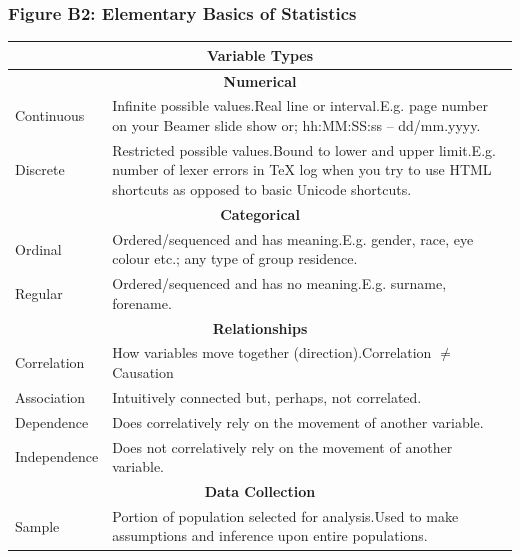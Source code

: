\documentclass[11pt, english]{article}
\begin{document}
		\subsubsection*{Figure B2: Elementary Basics of Statistics}

		\begin{center}
			\scriptsize
		\begin{longtable}{p{3cm}p{9cm}}
			\hline
			\hline
			\multicolumn{2}{c}{\textbf{Variable Types}}\\
			\hline
			\hline
			\multicolumn{2}{c}{\textbf{Numerical}}\\
			\hline
			Continuous & Infinite possible values.\newline Real line or interval.\newline E.g. page number on your Beamer slide show or; hh:MM:SS:ss -- dd/mm.yyyy.\\
			Discrete & Restricted possible values.\newline Bound to lower and upper limit.\newline E.g. number of lexer errors in {\TeX} log when you try to use HTML shortcuts as opposed to basic Unicode shortcuts.\\
			\hline
			\multicolumn{2}{c}{\textbf{Categorical}}\\
			\hline
			Ordinal & Ordered/sequenced and has meaning.\newline E.g. gender, race, eye colour etc.; any type of group residence.\\
			Regular & Ordered/sequenced and has no meaning.\newline E.g. surname, forename.\\
			\hline
			\multicolumn{2}{c}{\textbf{Relationships}}\\
			\hline
			Correlation & How variables move together (direction).\newline Correlation $\neq$ Causation\\
			Association & Intuitively connected but, perhaps, not correlated.\\
			Dependence & Does correlatively rely on the movement of another variable.\\
			Independence & Does not correlatively rely on the movement of another variable.\\
			\hline
			\hline
			\multicolumn{2}{c}{\textbf{Data Collection}}\\
			\hline
			\hline
			Sample & Portion of population selected for analysis.\newline Used to make assumptions and inference upon entire populations.\\

\end{longtable}
\end{center}
\end{document}
